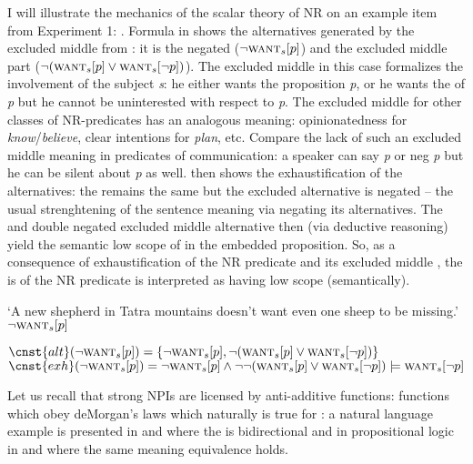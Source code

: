 \documentclass[output=paper, colorlinks, citecolor=brown, newtxmath]{langsci/langscibook}
\begin{document}
\noindent I will illustrate the mechanics of the scalar theory of NR on an example item from Experiment 1: . Formula in  shows the alternatives generated by the excluded middle  from : it is the negated  ($\neg \textsc{want}_s[p]$) and the excluded middle part ($\neg(\textsc{want}_s[p] \vee \textsc{want}_s[\neg p])$). The excluded middle in this case formalizes the involvement of the subject \textit{s}: he either wants the proposition \textit{p}, or he wants the  of \textit{p} but he cannot be uninterested with respect to \textit{p}. The excluded middle for other classes of NR-predicates has an analogous meaning: opinionatedness for \textit{know}/\textit{believe}, clear intentions for \textit{plan}, etc. Compare the lack of such an excluded middle meaning in predicates of communication: a speaker can say \textit{p} or neg \textit{p} but he can be silent about \textit{p} as well.  then shows the exhaustification of the alternatives: the  remains the same but the excluded alternative is negated -- the usual strenghtening of the sentence meaning via negating its alternatives. The  and double negated excluded middle alternative then (via deductive reasoning) yield the semantic low scope of  in the embedded proposition. So, as a consequence of exhaustification of the NR predicate and its excluded middle , the  is of the NR predicate is interpreted as having low scope (semantically).

\ea\label{ex-27} `A new shepherd in Tatra mountains doesn't want even one sheep to be missing.'\\ $\neg \textsc{want}_s[p]$
\z

\ea \ea \label{ex-28-a}$\cnst{alt}(\neg \textsc{want}_s[p])=\{\neg \textsc{want}_s[p], \neg(\textsc{want}_s[p] \vee \textsc{want}_s[\neg p])\}$
\ex \label{ex-28-b}$\cnst{exh}(\neg \textsc{want}_s[p])=\neg \textsc{want}_s[p] \wedge \neg \neg(\textsc{want}_s[p] \vee \textsc{want}_s[\neg p]) \models \textsc{want}_s[\neg p]$
\z
\z

\noindent Let us recall that strong NPIs are licensed by anti-additive functions: functions which obey deMorgan's laws which naturally is true for : a natural language example is presented in  and  where the  is bidirectional and in propositional logic in  and  where the same meaning equivalence holds.
\end{document}
